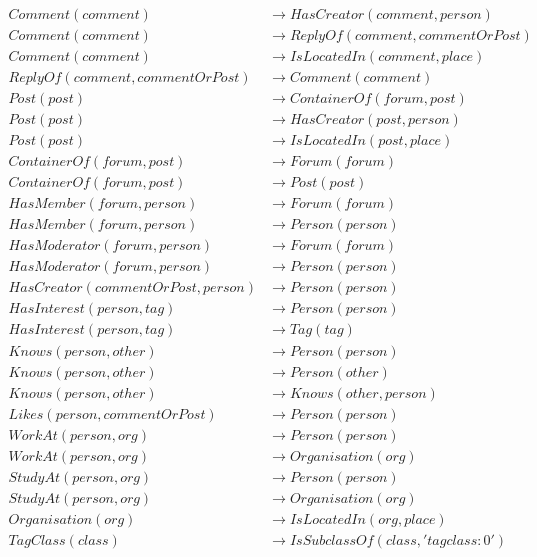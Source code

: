\begin{figure}[H]
    \centering
    \small
    \begin{align*}
        Comment(comment) &\to HasCreator(comment, person) \\
        Comment(comment) &\to ReplyOf(comment, commentOrPost) \\
        Comment(comment) &\to IsLocatedIn(comment, place) \\
        ReplyOf(comment, commentOrPost) &\to Comment(comment) \\
        Post(post) &\to ContainerOf(forum, post) \\
        Post(post) &\to HasCreator(post, person) \\
        Post(post) &\to IsLocatedIn(post, place) \\
        ContainerOf(forum, post) &\to Forum(forum) \\
        ContainerOf(forum, post) &\to Post(post) \\
        HasMember(forum, person) &\to Forum(forum) \\
        HasMember(forum, person) &\to Person(person) \\
        HasModerator(forum, person) &\to Forum(forum) \\
        HasModerator(forum, person) &\to Person(person) \\
        HasCreator(commentOrPost, person) &\to Person(person) \\
        HasInterest(person, tag) &\to Person(person) \\
        HasInterest(person, tag) &\to Tag(tag) \\
        Knows(person, other) &\to Person(person) \\
        Knows(person, other) &\to Person(other) \\
        Knows(person, other) &\to Knows(other, person) \\
        Likes(person, commentOrPost) &\to Person(person) \\
        WorkAt(person, org) &\to Person(person) \\
        WorkAt(person, org) &\to Organisation(org) \\
        StudyAt(person, org) &\to Person(person) \\
        StudyAt(person, org) &\to Organisation(org) \\
        Organisation(org) &\to IsLocatedIn(org, place) \\
        TagClass(class) &\to IsSubclassOf(class, 'tagclass:0') \\

\end{align*}
\end{figure}
